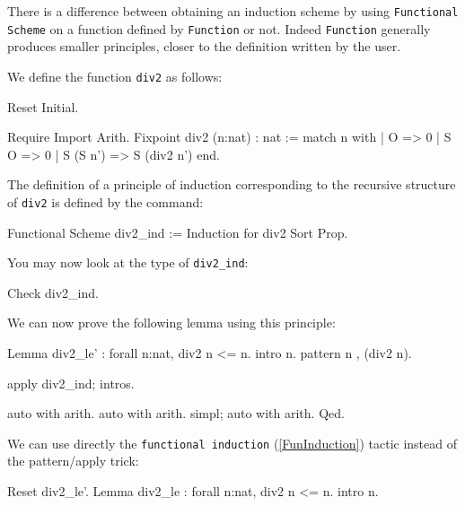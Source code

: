 \Rem
There is a difference between obtaining an induction scheme by using
\texttt{Functional Scheme} on a function defined by \texttt{Function}
or not. Indeed \texttt{Function} generally produces smaller
principles, closer to the definition written by the user.

\firstexample
{}
\label{FunScheme-examples}

We define the function \texttt{div2} as follows:

\begin{coq_eval}
Reset Initial.
\end{coq_eval}

\begin{coq_example*}
Require Import Arith.
Fixpoint div2 (n:nat) : nat :=
  match n with
  | O => 0
  | S O => 0
  | S (S n') => S (div2 n')
  end.
\end{coq_example*}

The definition of a principle of induction corresponding to the
recursive structure of \texttt{div2} is defined by the command:

\begin{coq_example}
Functional Scheme div2_ind := Induction for div2 Sort Prop.
\end{coq_example}

You may now look at the type of {\tt div2\_ind}:

\begin{coq_example}
Check div2_ind.
\end{coq_example}

We can now prove the following lemma using this principle:

\begin{coq_example*}
Lemma div2_le' : forall n:nat, div2 n <= n.
intro n.
 pattern n , (div2 n).
\end{coq_example*}

\begin{coq_example}
apply div2_ind; intros.
\end{coq_example}

\begin{coq_example*}
auto with arith.
auto with arith.
simpl; auto with arith.
Qed.
\end{coq_example*}

We can use directly the \texttt{functional induction}
(\ref{FunInduction}) tactic instead of the pattern/apply trick:

\begin{coq_example*}
Reset div2_le'.
Lemma div2_le : forall n:nat, div2 n <= n.
intro n.
\end{coq_example*}

